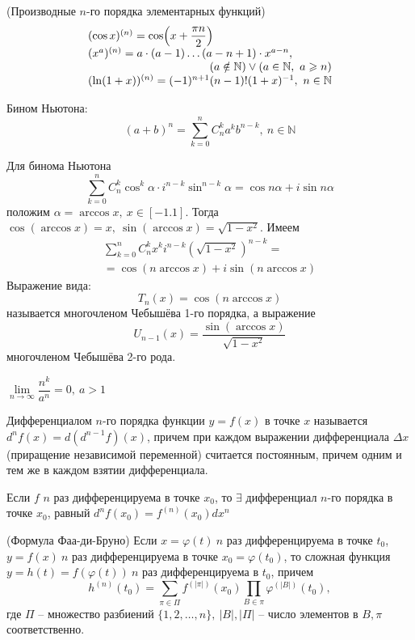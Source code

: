 \begin{multicols}{2}
\begin{theorema}{(Производные $n$-го порядка элементарных функций)}{}
\[\begin{array}{l}
                (\cos x)^{(n)} = \cos(x+\dfrac{\pi n}{2})\\
                (x^a)^{(n)} = a\cdot (a-1)\ldots (a-n+1)\cdot x^{a-n},\ \\
                \hfill (a\notin \mathbb N) \vee (a\in\mathbb N, \ a \geq n)\\
                (\ln(1+x))^{(n)} = (-1)^{n+1}(n-1)!(1+x)^{-1},\ n\in\mathbb N
        \end{array}
    \]
\end{theorema}
    \cons Бином Ньютона: \[(a+b)^n = \sum\limits_{k=0}^n C_n^ka^kb^{n-k},\ n\in\mathbb N\]
    \begin{proposition}{}{} Для бинома Ньютона\[
            \sum\limits_{k=0}^n C_n^k \cos^k\alpha \cdot i^{n-k}\sin^{n-k}\alpha = \cos n\alpha + i\sin n\alpha
    \]положим $\alpha = \arccos x,\ x\in [-1.1]$. Тогда $\cos(\arccos x) = x,\ \sin(\arccos x) = \sqrt{1-x^2}.$ Имеем
    \[
        \begin{array}{c}
            \sum\limits_{k=0}^n C_n^kx^ki^{n-k}(\sqrt{1-x^2})^{n-k} = \\ = \cos(n\arccos x) + i\sin(n\arccos x)            
        \end{array}
    \]
    Выражение вида:\[
        T_n(x) = \cos(n\arccos x)
    \] называется многочленом Чебышёва 1-го порядка, а выражение\[
    U_{n-1}(x) = \dfrac{\sin(\arccos x)}{\sqrt{1-x^2}}
    \] многочленом Чебышёва 2-го рода.
\end{proposition}
    \cons $\lim\limits_{n \to \infty} \dfrac{n^k}{a^n} = 0,\ a > 1$
    \begin{definition}{}{} 
        Дифференциалом $n$-го порядка функции $y = f(x)$ в точке $x$ называется $d^nf(x) = d(d^{n-1}f)(x)$, причем при каждом выражении дифференциала $\Delta x$ (приращение независимой переменной) считается постоянным, причем одним и тем же в каждом взятии дифференциала.
    \end{definition}
    \begin{note}{}{}
        Если $f$ $n$ раз дифференцируема в точке $x_0$, то $\exists$ дифференциал $n$-го порядка в точке $x_0$, равный $d^nf(x_0) = f^{(n)}(x_0)dx^n$
    \end{note}
    \begin{theorema}{(Формула Фаа-ди-Бруно)}{}
     Если $x = \varphi(t)\ n$ раз дифференцируема в точке $t_0$, $y = f(x)\ n$ раз дифференцируема в точке $x_0 = \varphi(t_0)$, то сложная функция $y = h(t) = f(\varphi(t))\ n$ раз дифференцируема в $t_0$, причем \[
            h^{(n)} (t_0) = \sum\limits_{\pi \in\Pi} f^{(|\pi|)}(x_0)\prod\limits_{B \in \pi}\varphi^{(|B|)}(t_0),
    \] где $\Pi$ -- множество разбиений $\{1,2,\ldots, n\},\ |B|, |\Pi|$ -- число элементов в $B, \pi$ соответственно.
    \end{theorema}


\end{multicols}
